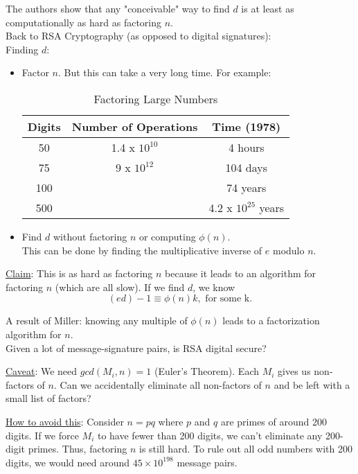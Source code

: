 The authors show that any "conceivable" way to find $d$ is at least as computationally as hard as factoring $n$.\\ 
Back to RSA Cryptography (as opposed to digital signatures):\\
Finding $d$:
\begin{itemize}
\item Factor $n$. But this can take a very long time.
For example:
\begin{table}[ht]
\caption{Factoring Large Numbers}
\centering
\begin{tabular}{c c c}
\hline \hline
Digits & Number of Operations & Time (1978) \\ [.5ex]
\hline
50 & 1.4 x $10^{10}$ & 4 hours \\
75 & 9 x $10^{12}$ & 104 days \\
100 &  & 74 years \\
500 &  & 4.2 x $10^{25}$ years \\ [1ex]
\hline
\end{tabular}
\end{table}

\item Find $d$ without factoring $n$ or computing $\phi(n)$.\\This can be done by finding the multiplicative inverse of $e$ modulo $n$.
\end{itemize}
\underline{Claim}: This is as hard as factoring $n$ because it leads to an algorithm for factoring $n$ (which are all slow).
If we find $d$, we know $$(ed)-1 \equiv \phi(n)k, \text{ for some k}.$$

A result of Miller: knowing any multiple of $\phi(n)$ leads to a factorization algorithm for $n$.\\

Given a lot of message-signature pairs, is RSA digital secure? 

\underline{Caveat}: We need $gcd(M_i, n) = 1$ (Euler's Theorem). Each $M_i$ gives us non-factors of $n$. Can we accidentally eliminate all non-factors of $n$ and be left with a small list of factors?

\underline{How to avoid this}: Consider $n = pq$ where $p$ and $q$ are primes of around 200 digits. If we force $M_i$ to have fewer than 200 digits, we can't eliminate any 200-digit primes. Thus, factoring $n$ is still hard. To rule out all odd numbers with 200 digits, we would need around $45 \times 10^{198}$ message pairs.

